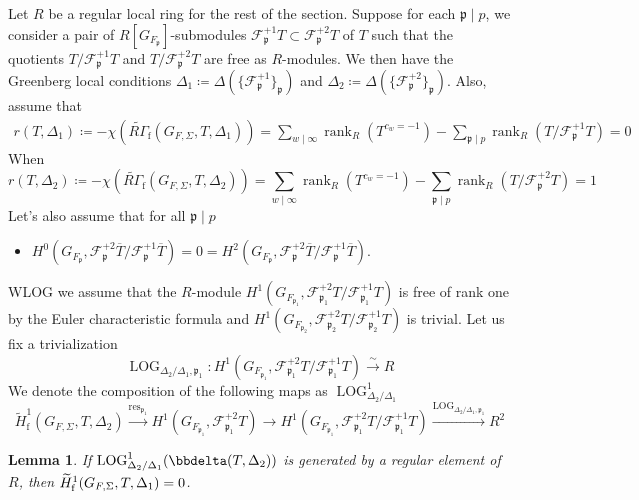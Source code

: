 \documentclass[10pt]{amsart}
\makeatletter
\numberwithin{equation}{section}
\newcommand{\mylabel}[2]{#2\def\@currentlabel{#2}\label{#1}}
\newtheorem{lemma}[thm]{Lemma}
\theoremstyle{definition}
\theoremstyle{remark} %
\DeclareMathOperator{\LOG}{LOG}
\DeclareMathOperator{\rank}{rank}
\DeclareMathOperator{\res}{res}
\newcommand{\scrF}{\mathscr{F}}
\newcommand{\p}{\mathfrak{p}}
\makeatother
\begin{document}
		\subsubsection{}
		Let $ R $ be a regular local ring for the rest of the section. 
		Suppose for each $\p \mid p$, we consider a pair of $R[G_{F_{\p}}]$-submodules $\scrF^{+1}_{\p}T \subset \scrF^{+2}_{\p}T$ of $T$ such that the quotients $T/\scrF^{+1}_{\p}T $ and $T/\scrF^{+2}_{\p}T $ are free as $R$-modules. We then have the Greenberg local conditions
		$\Delta_1 \coloneqq \Delta(\{\scrF^{+1}_\p\}_\p)$ and $\Delta_2 \coloneqq \Delta(\{\scrF^{+2}_\p\}_\p)$. Also, assume that 
		\begin{equation*}
			\begin{split}
				r(T,\Delta_1) \coloneqq -\chi(\widetilde{R\Gamma}_{\mathrm{f}}(G_{F,\Sigma},T,\Delta_1)) = \sum_{w \mid \infty} \rank_R(T^{c_w = -1}) - \sum_{\p \mid p} \rank_R(T/\scrF^{+1}_{\p}T) =0 
			\end{split}
		\end{equation*}
		When $$ 	r(T,\Delta_2) \coloneqq -\chi(\widetilde{R\Gamma}_{\mathrm{f}}(G_{F,\Sigma},T,\Delta_2)) = \sum_{w \mid \infty} \rank_R(T^{c_w = -1}) - \sum_{\p \mid p} \rank_R(T/\scrF^{+2}_{\p}T) = 1 $$
		Let's also assume that for all $\p \mid p$
		\begin{itemize}
			\item[\mylabel{LT}{\textbf{(LT)}}] 	$H^0(G_{F_{\p}}, \scrF^{+2}_{\p}\overline{T}/\scrF^{+1}_{\p}\overline{T}) = 0 =H^2(G_{F_{\p}}, \scrF^{+2}_{\p}\overline{T}/\scrF^{+1}_{\p}\overline{T}). $ 
		\end{itemize}
		WLOG we assume that the $R$-module $H^1(G_{F_{\p_1}}, \scrF^{+2}_{\p_1}T/\scrF^{+1}_{\p_1}T)$ is free of rank one by the Euler characteristic formula and $H^1(G_{F_{\p_2}}, \scrF^{+2}_{\p_2}T/\scrF^{+1}_{\p_2}T)$ is trivial. Let us fix a trivialization
		$$ \LOG_{\Delta_2/\Delta_1, \p_1 } \colon H^1(G_{F_{\p_1}}, \scrF^{+2}_{\p_1}T/\scrF^{+1}_{\p_1}T) \xrightarrow{\sim} R $$
		We denote the composition of the following maps as $ \LOG^1_{\Delta_2/\Delta_1} $
		$$  \widetilde{H}^1_{\mathrm{f}}(G_{F,\Sigma},T,\Delta_2) \xrightarrow{ \res_{\p_1}}  H^1(G_{F_{\p_1}}, \scrF^{+2}_{\p_1}T) \rightarrow  H^1(G_{F_{\p_1}}, \scrF^{+2}_{\p_1}T/\scrF^{+1}_{\p_1}T) \xrightarrow{\LOG_{\Delta_2/\Delta_1 , \p_1} } R^2 $$
		\begin{lemma}
			\label{lemma_log_H^1_vanishes}
			If $\LOG^1_{\Delta_2/\Delta_1}(\bbdelta(T, \Delta_2))$ is generated by a regular element of $R$,  
			then $\widetilde{H}^1_{\rm f}(G_{F, \Sigma}, T, \Delta_1) = 0$. 
		\end{lemma}
\end{document}
